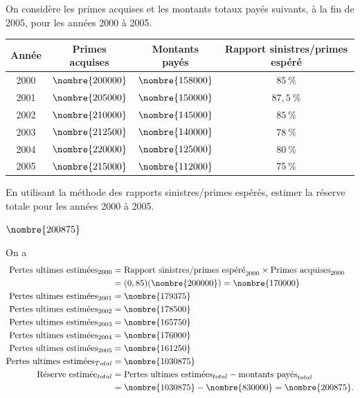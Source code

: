 \begin{exercice}
  On considère les primes acquises et les montants totaux payés
  suivants, à la fin de 2005, pour les années 2000 à 2005.
  \begin{center}
    \begin{tabular}{|c | c c c |}\hline
      Année & Primes acquises & Montants payés & Rapport sinistres/primes espéré\\ \hline
      2000 & $\nombre{200000}$ & $\nombre{158000}$ & $85~\%$\\
      2001 & $\nombre{205000}$ & $\nombre{150000}$ & $87,5~\%$\\
      2002 & $\nombre{210000}$ & $\nombre{145000}$ & $85~\%$\\
      2003 & $\nombre{212500}$ & $\nombre{140000}$ & $78~\%$\\
      2004 & $\nombre{220000}$ & $\nombre{125000}$ & $80~\%$\\
      2005 & $\nombre{215000}$ & $\nombre{112000}$ & $75~\%$ \\ \hline
    \end{tabular}
  \end{center}
  En utilisant la méthode des rapports sinistres/primes espérés,
  estimer la réserve totale pour les années 2000 à 2005.
  \begin{rep}
    $\nombre{200875}$
  \end{rep}
  \begin{sol}
    On a
    \begin{align*}
      \text{Pertes ultimes estimées}_{2000} &= \text{Rapport
                                              sinistres/primes espéré}_{2000} \times \text{Primes
                                              acquises}_{2000}\\
                                            &= (0,85)(\nombre{200000}) = \nombre{170000}\\
      \text{Pertes ultimes estimées}_{2001} &= \nombre{179375}\\
      \text{Pertes ultimes estimées}_{2002} &= \nombre{178500}\\
      \text{Pertes ultimes estimées}_{2003} &= \nombre{165750}\\
      \text{Pertes ultimes estimées}_{2004} &= \nombre{176000}\\
      \text{Pertes ultimes estimées}_{2005} &= \nombre{161250}\\
      \text{Pertes ultimes estimées}_{Total} &= \nombre{1030875}\\
      \text{Réserve estimée}_{total} &= \text{Pertes ultimes estimées}_{total} - \text{montants payés}_{total}\\
                                            &=  \nombre{1030875} - \nombre{830000} = \nombre{200875}.
    \end{align*}
  \end{sol}
\end{exercice}

